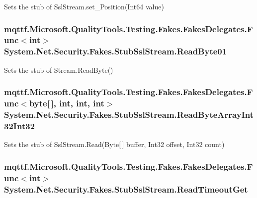 Sets the stub of Ssl\-Stream.\-set\-\_\-\-Position(\-Int64 value)

\hypertarget{class_system_1_1_net_1_1_security_1_1_fakes_1_1_stub_ssl_stream_a19907872265fe2e7c559790cbbf324a8}{
\subsubsection[{Read\-Byte01}]{\setlength{\rightskip}{0pt plus 5cm}mqttf.\-Microsoft.\-Quality\-Tools.\-Testing.\-Fakes.\-Fakes\-Delegates.\-Func$<$int$>$ System.\-Net.\-Security.\-Fakes.\-Stub\-Ssl\-Stream.\-Read\-Byte01}}\label{class_system_1_1_net_1_1_security_1_1_fakes_1_1_stub_ssl_stream_a19907872265fe2e7c559790cbbf324a8}


Sets the stub of Stream.\-Read\-Byte()

\hypertarget{class_system_1_1_net_1_1_security_1_1_fakes_1_1_stub_ssl_stream_a0e3322ed65f33b6d7f376d6ba4f39042}{
\subsubsection[{Read\-Byte\-Array\-Int32\-Int32}]{\setlength{\rightskip}{0pt plus 5cm}mqttf.\-Microsoft.\-Quality\-Tools.\-Testing.\-Fakes.\-Fakes\-Delegates.\-Func$<$byte\mbox{[}$\,$\mbox{]}, int, int, int$>$ System.\-Net.\-Security.\-Fakes.\-Stub\-Ssl\-Stream.\-Read\-Byte\-Array\-Int32\-Int32}}\label{class_system_1_1_net_1_1_security_1_1_fakes_1_1_stub_ssl_stream_a0e3322ed65f33b6d7f376d6ba4f39042}


Sets the stub of Ssl\-Stream.\-Read(\-Byte\mbox{[}$\,$\mbox{]} buffer, Int32 offset, Int32 count)

\hypertarget{class_system_1_1_net_1_1_security_1_1_fakes_1_1_stub_ssl_stream_a2a63432a8ceea5f3c4e4867260adf80f}{
\subsubsection[{Read\-Timeout\-Get}]{\setlength{\rightskip}{0pt plus 5cm}mqttf.\-Microsoft.\-Quality\-Tools.\-Testing.\-Fakes.\-Fakes\-Delegates.\-Func$<$int$>$ System.\-Net.\-Security.\-Fakes.\-Stub\-Ssl\-Stream.\-Read\-Timeout\-Get}}\label{class_system_1_1_net_1_1_security_1_1_fakes_1_1_stub_ssl_stream_a2a63432a8ceea5f3c4e4867260adf80f}



